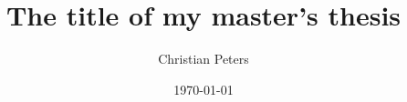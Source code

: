 \documentclass[a4paper,12pt,bibliography=totoc, listof=totoc]{scrartcl}
\title{The title of my master's thesis}
\author{Christian Peters}
\date{\today}
\begin{document}












\newpage

\nocite{*}





\end{document}
